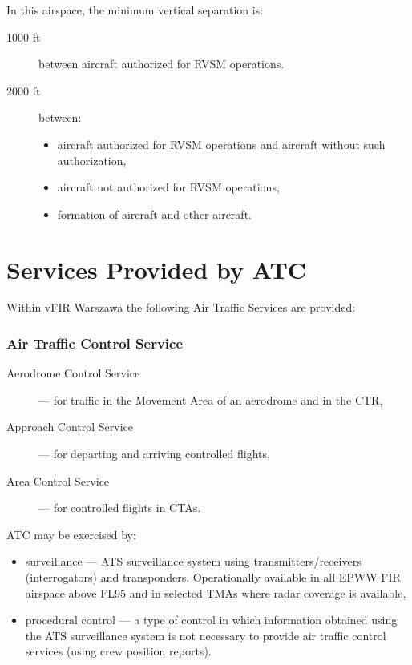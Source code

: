 In this airspace, the minimum vertical separation is:
\begin{description}
    \item[1000 ft] between aircraft authorized for RVSM operations.
    \item[2000 ft] between:
          \begin{itemize}
              \item aircraft authorized for RVSM operations and aircraft without such authorization,
              \item aircraft not authorized for RVSM operations,
              \item formation of aircraft and other aircraft.
          \end{itemize}
\end{description}

\clearpage%
\section{Services Provided by ATC}%
\label{sect:airspace:services}

Within vFIR Warszawa the following Air Traffic Services are provided:
\subsubsection{Air Traffic Control Service}
\begin{description}
    \item[Aerodrome Control Service] --- for traffic in the Movement Area of an aerodrome and in the CTR,
    \item[Approach Control Service] --- for departing and arriving controlled flights,
    \item[Area Control Service] --- for controlled flights in CTAs.
\end{description}

ATC may be exercised by:
\begin{itemize}
    \item surveillance --- ATS surveillance system using transmitters/receivers (interrogators) and transponders. Operationally available in all EPWW FIR airspace above FL95 and in selected TMAs where radar coverage is available,
    \item procedural control --- a type of control in which information obtained using the ATS surveillance system is not necessary to provide air traffic control services (using crew position reports).
\end{itemize}

